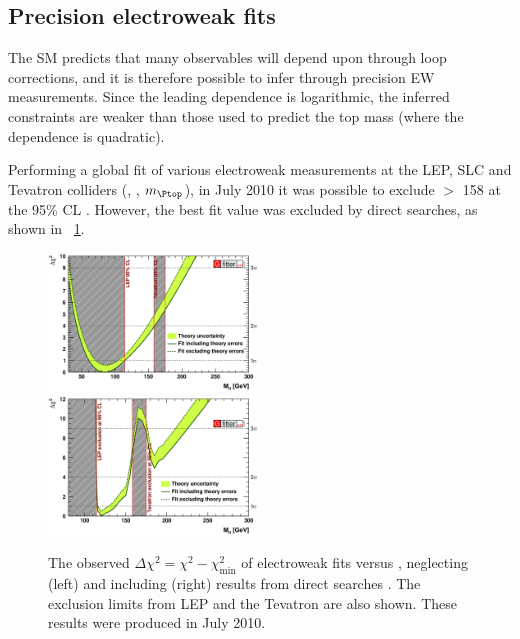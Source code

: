 \subsection{Precision electroweak fits}
\label{sec:prior_constraints:ew_fits}

The SM predicts that many observables will depend upon \mH through loop corrections,
and it is therefore possible to infer \mH through precision EW measurements. Since 
the leading \mH dependence is logarithmic, the inferred constraints are weaker than those
used to predict the top mass (where the dependence is quadratic).

Performing a global fit of various electroweak measurements at the LEP, SLC and
Tevatron colliders (\eg \mW, \mZ, $m_{\Ptop}$), in July 2010 it was possible to exclude 
\mH $>$ \unit{158}{\GeV} at the 95\% CL \cite{Gfitter:2008}. However, the best fit 
value was excluded by direct searches, as shown in \Figure~\ref{fig:ewfit}.

\begin{figure}[t]
	\includegraphics[width=0.495\textwidth]{tex/motivation/ewfit_nodirect}
	\hfill
	\includegraphics[width=0.495\textwidth]{tex/motivation/ewfit_withdirect}
	\caption{The observed $\Delta\chi^2 = \chi^2 - \chi^2_{\min}$ of electroweak fits 
	versus \mH, neglecting (left) and including (right) results from direct searches
	\cite{Gfitter:2008}. The exclusion limits from LEP and the Tevatron are also shown.
	These results were produced in July 2010.}
	\label{fig:ewfit}
\end{figure}

